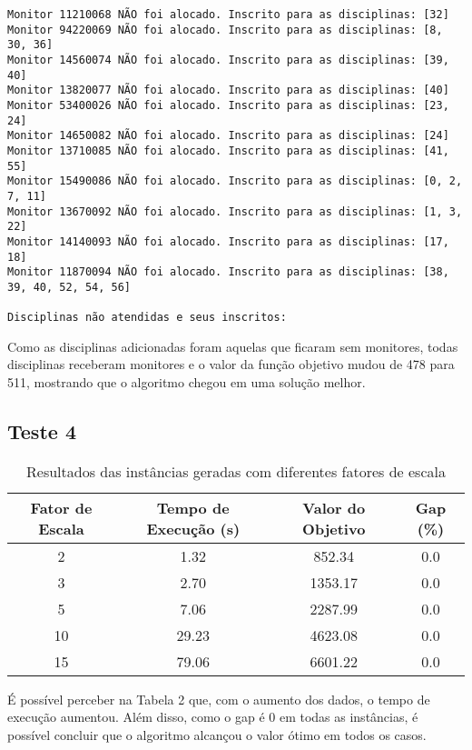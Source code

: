 \documentclass[a4paper,12pt]{article}
\begin{document}
\begin{lstlisting}[breaklines=true]
Monitor 11210068 NÃO foi alocado. Inscrito para as disciplinas: [32]
Monitor 94220069 NÃO foi alocado. Inscrito para as disciplinas: [8, 30, 36]
Monitor 14560074 NÃO foi alocado. Inscrito para as disciplinas: [39, 40]
Monitor 13820077 NÃO foi alocado. Inscrito para as disciplinas: [40]
Monitor 53400026 NÃO foi alocado. Inscrito para as disciplinas: [23, 24]
Monitor 14650082 NÃO foi alocado. Inscrito para as disciplinas: [24]
Monitor 13710085 NÃO foi alocado. Inscrito para as disciplinas: [41, 55]
Monitor 15490086 NÃO foi alocado. Inscrito para as disciplinas: [0, 2, 7, 11]
Monitor 13670092 NÃO foi alocado. Inscrito para as disciplinas: [1, 3, 22]
Monitor 14140093 NÃO foi alocado. Inscrito para as disciplinas: [17, 18]
Monitor 11870094 NÃO foi alocado. Inscrito para as disciplinas: [38, 39, 40, 52, 54, 56]

Disciplinas não atendidas e seus inscritos:
\end{lstlisting}

Como as disciplinas adicionadas foram aquelas que ficaram sem monitores, todas disciplinas receberam monitores e o valor da função objetivo mudou de 478 para 511, mostrando que o algoritmo chegou em uma solução melhor.

\subsection{Teste 4}

\begin{table}[h!]
    \centering
    \begin{tabular}{|c|c|c|c|}
        \hline
        \textbf{Fator de Escala} & \textbf{Tempo de Execução (s)} & \textbf{Valor do Objetivo} & \textbf{Gap (\%)} \\
        \hline
        2 & 1.32 & 852.34 & 0.0 \\
        3 & 2.70 & 1353.17 & 0.0 \\
        5 & 7.06 & 2287.99 & 0.0 \\
        10 & 29.23 & 4623.08 & 0.0 \\
        15 & 79.06 & 6601.22 & 0.0 \\
        \hline
    \end{tabular}
    \caption{Resultados das instâncias geradas com diferentes fatores de escala}
    \label{tab:resultados}
\end{table}

É possível perceber na Tabela 2 que, com o aumento dos dados, o tempo de execução aumentou. Além disso, como o gap é 0 em todas as instâncias, é possível concluir que o algoritmo alcançou o valor ótimo em todos os casos.
\end{document}
